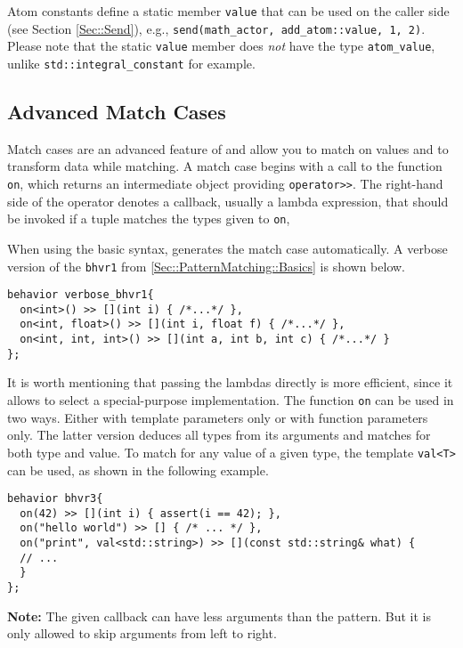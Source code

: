 Atom constants define a static member \lstinline^value^ that can be used on the caller side (see Section \ref{Sec::Send}), e.g., \lstinline^send(math_actor, add_atom::value, 1, 2)^.
Please note that the static \lstinline^value^ member does \emph{not} have the type \lstinline^atom_value^, unlike \lstinline^std::integral_constant^ for example.

\clearpage
\subsection{Advanced Match Cases}

Match cases are an advanced feature of \lib and allow you to match on values and to transform data while matching.
A match case begins with a call to the function \lstinline^on^, which returns an intermediate object providing \lstinline^operator>>^.
The right-hand side of the operator denotes a callback, usually a lambda expression, that should be invoked if a tuple matches the types given to \lstinline^on^,

When using the basic syntax, \lib generates the match case automatically.
A verbose version of the \lstinline^bhvr1^ from \ref{Sec::PatternMatching::Basics} is shown below.

\begin{lstlisting}
behavior verbose_bhvr1{
  on<int>() >> [](int i) { /*...*/ },
  on<int, float>() >> [](int i, float f) { /*...*/ },
  on<int, int, int>() >> [](int a, int b, int c) { /*...*/ }
};
\end{lstlisting}

It is worth mentioning that passing the lambdas directly is more efficient, since it allows \lib to select a special-purpose implementation.
The function \lstinline^on^ can be used in two ways.
Either with template parameters only or with function parameters only.
The latter version deduces all types from its arguments and matches for both type and value.
To match for any value of a given type, the template \lstinline^val<T>^ can be used, as shown in the following example.

\begin{lstlisting}
behavior bhvr3{
  on(42) >> [](int i) { assert(i == 42); },
  on("hello world") >> [] { /* ... */ },
  on("print", val<std::string>) >> [](const std::string& what) {
  // ...
  }
};
\end{lstlisting}

\textbf{Note:} The given callback can have less arguments than the pattern.
But it is only allowed to skip arguments from left to right.

